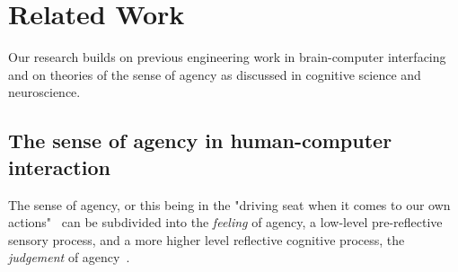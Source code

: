 \section{Related Work}


Our research builds on previous engineering work in brain-computer interfacing and on theories of the sense of agency as discussed in cognitive science and neuroscience.

\subsection{The sense of agency in human-computer interaction}
\begin{comment}

Agency is largely explained with a comparator model, describing internal comutational mechanisms of human action control 
-- comparator model (Blakemore 2002, Frith 2000, Frith 2005)
-- integrate predictive coding??

\subsection{neural basis of sense of agency}

\end{comment}

The sense of agency, or this being in the "driving seat when it comes to our own actions"~\cite{Moore2016-ub} can be subdivided into the \textit{feeling} of agency, a low-level pre-reflective sensory process, and a more higher level reflective cognitive process, the \textit{judgement} of agency~\cite{Moore2016-ub, Danry2022-xk}.



